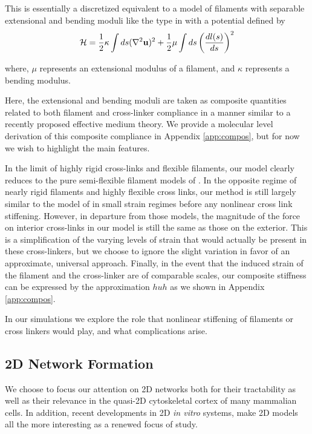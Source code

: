 \documentclass[pre,preprint]{revtex4-1}
\begin{document}
This is essentially a discretized equivalent to a model of filaments with separable extensional and bending moduli like the type in \cite{theo_hlm} with a potential defined by
\begin{equation}
{\cal H} =\frac{1}{2}\kappa \int ds(\nabla^2\mathbf{u})^2 + \frac{1}{2}\mu \int ds \left ( \frac{dl(s) }{ds} \right )^2
\end{equation}

where, $\mu$ represents an extensional modulus of a filament, and $\kappa$ represents a bending modulus.   

Here, the extensional and bending moduli are taken as composite quantities related to both filament and cross-linker compliance in a manner similar to a recently proposed effective medium theory\cite{theo_crosslinknonlinear}.  We provide a molecular level derivation of this composite compliance in Appendix \ref{app:compos}, but for now we wish to highlight the main features.  

In the limit of highly rigid cross-links and flexible filaments, our model clearly reduces to the pure semi-flexible filament models of \cite{theo_hlm,theo_hlm2}.  In the opposite regime of nearly rigid filaments and highly flexible cross links, our method is still largely similar to the model of \cite{theo_crosslinknonlinear} in small strain regimes before any nonlinear cross link stiffening.  However, in departure from those models, the magnitude of the force on interior cross-links in our model is still the same as those on the exterior.  This is a simplification of the varying levels of strain that would actually be present in these cross-linkers, but we choose to ignore the slight variation in favor of an approximate, universal approach.  Finally, in the event that the induced strain of the filament and the cross-linker are of comparable scales, our composite stiffness can be expressed by the approximation $huh$ as we shown in Appendix \ref{app:compos}.

In our simulations we explore the role that nonlinear stiffening of filaments or cross linkers would play, and what complications arise.

\subsection{2D Network Formation}

We choose to focus our attention on 2D networks both for their tractability as well as their relevance in the quasi-2D cytoskeletal cortex of many mammalian cells\cite{cellmech_flows}.  In addition, recent developments in 2D {\em in vitro} systems\cite{rheo_2D1,rheo_2D2}, make 2D models all the more interesting as a renewed focus of study.
\end{document}
